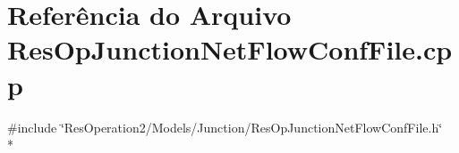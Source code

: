 \section{Referência do Arquivo Res\+Op\+Junction\+Net\+Flow\+Conf\+File.\+cpp}
\label{_res_op_junction_net_flow_conf_file_8cpp}
{\ttfamily \#include \char`\"{}Res\+Operation2/\+Models/\+Junction/\+Res\+Op\+Junction\+Net\+Flow\+Conf\+File.\+h\char`\"{}}\\*
